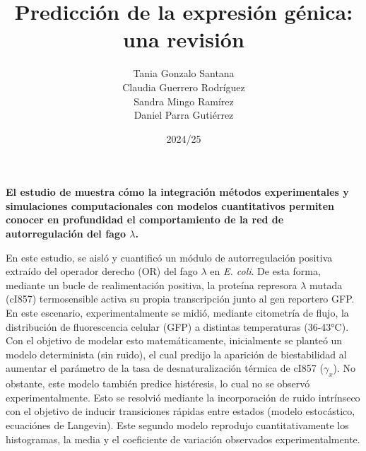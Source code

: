 \documentclass[nochap]{config/ejercicios}
\title{Predicción de la expresión génica: una revisión}
\author{Tania Gonzalo Santana \\ Claudia Guerrero Rodríguez \\ Sandra Mingo Ramírez \\ Daniel Parra Gutiérrez }
\date{2024/25}
\begin{document}
\maketitle

\large
\textbf{El estudio de \cite{Isaacs2003} muestra cómo la integración métodos experimentales y simulaciones computacionales con modelos cuantitativos permiten conocer en profundidad el comportamiento de la red de autorregulación del fago $\lambda$.}
\normalsize

En este estudio, se aisló y cuantificó un módulo de autorregulación positiva extraído del operador derecho (OR) del fago $\lambda$ en \textit{E. coli}. De esta forma, mediante un bucle de realimentación positiva, la proteína represora $\lambda$ mutada (cI857) termosensible activa su propia transcripción junto al gen reportero GFP. En este escenario, experimentalmente se midió, mediante citometría de flujo, la distribución de fluorescencia celular (GFP) a distintas temperaturas (36-43°C). Con el objetivo de modelar esto matemáticamente, inicialmente se planteó un modelo determinista (sin ruido), el cual predijo la aparición de biestabilidad al aumentar el parámetro de la tasa de desnaturalización térmica de cI857 ($\gamma_x$). No obstante, este modelo también predice histéresis, lo cual no se observó experimentalmente. Esto se resolvió mediante la incorporación de ruido intrínseco con el objetivo de inducir transiciones rápidas entre estados (modelo estocástico, ecuaciónes de Langevin). Este segundo modelo reprodujo cuantitativamente los histogramas, la media y el coeficiente de variación observados experimentalmente.
\end{document}
